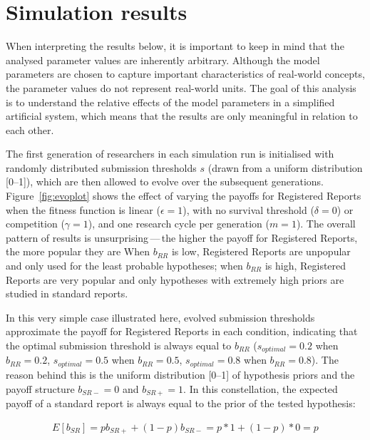 \documentclass[british,,man,mask,floatsintext]{apa6}
\begin{document}
\hypertarget{simulation-results}{%
\section{Simulation results}\label{simulation-results}}

When interpreting the results below, it is important to keep in mind that the analysed parameter values are inherently arbitrary.
Although the model parameters are chosen to capture important characteristics of real-world concepts, the parameter values do not represent real-world units.
The goal of this analysis is to understand the relative effects of the model parameters in a simplified artificial system, which means that the results are only meaningful in relation to each other.

The first generation of researchers in each simulation run is initialised with randomly distributed submission thresholds \(s\) (drawn from a uniform distribution {[}0--1{]}), which are then allowed to evolve over the subsequent generations.
Figure~\ref{fig:evoplot} shows the effect of varying the payoffs for Registered Reports when the fitness function is linear (\(\epsilon = 1\)), with no survival threshold (\(\delta = 0\)) or competition (\(\gamma = 1\)), and one research cycle per generation (\(m = 1\)).
The overall pattern of results is unsurprising\(\,\)---\(\,\)the higher the payoff for Registered Reports, the more popular they are
When \(b_{RR}\) is low, Registered Reports are unpopular and only used for the least probable hypotheses; when \(b_{RR}\) is high, Registered Reports are very popular and only hypotheses with extremely high priors are studied in standard reports.

In this very simple case illustrated here, evolved submission thresholds approximate the payoff for Registered Reports in each condition, indicating that the optimal submission threshold is always equal to \(b_{RR}\) (\(s_{optimal} = 0.2\) when \(b_{RR} = 0.2\), \(s_{optimal} = 0.5\) when \(b_{RR} = 0.5\), \(s_{optimal} = 0.8\) when \(b_{RR} = 0.8\)).
The reason behind this is the uniform distribution {[}0--1{]} of hypothesis priors and the payoff structure \(b_{SR-} = 0\) and \(b_{SR+} = 1\).
In this constellation, the expected payoff of a standard report is always equal to the prior of the tested hypothesis:

\begin{align}
E[b_{SR}] = p b_{SR+} + (1-p)b_{SR-} = p * 1 +  (1-p) * 0 = p
\end{align}
\end{document}
